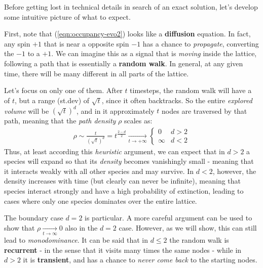 \documentclass[../../main.tex]{subfiles}
\begin{document}
Before getting lost in technical details in search of an exact solution, let's develop some intuitive picture of what to expect. 

\medskip

First, note that (\ref{eqn:occupancy-evo2}) looks like a \textbf{diffusion} equation. In fact, any spin $+1$ that is near a opposite spin $-1$ has a chance to \textit{propagate}, converting the $-1$ to a $+1$. We can imagine this as a signal that is \textit{moving} inside the lattice, following a path that is essentially a \textbf{random walk}. In general, at any given time, there will be many different  in all parts of the lattice.

\medskip

Let's focus on only one of them. After $t$ timesteps, the random walk will have a  of $t$, but a range (st.dev) of $\sqrt{t}$, since it often backtracks. So the entire \textit{explored volume} will be $(\sqrt{t})^d$, and in it approximately $t$ nodes are traversed by that path, meaning that the \textit{path density} $\rho$ scales as:
\begin{align*}
    \rho \sim \frac{t}{(\sqrt{t})^d} = t^{\frac{2-d}{2}}  \xrightarrow[t \to +\infty]{} \begin{cases}
        0 & d > 2\\
        \infty & d < 2
    \end{cases}
\end{align*} 
Thus, at least according this \textit{heuristic} argument, we can expect that in $d > 2$ a species will expand so that its \textit{density} becomes vanishingly small - meaning that it interacts weakly with all other species and may survive. In $d < 2$, however, the density increases with time (but clearly can never be infinite), meaning that species interact strongly and have a high probability of extinction, leading to cases where only one species dominates over the entire lattice.

\medskip

The boundary case $d=2$ is particular. A more careful argument can be used to show that $\rho  \xrightarrow[t \to \infty]{} 0$ also in the $d=2$ case. However, as we will show, this can still lead to \textit{monodominance}. It can be said that in $d \leq 2$ the random walk is \textbf{recurrent} - in the sense that it visits many times the same nodes - while in $d > 2$ it is \textbf{transient}, and has a chance to \textit{never come back} to the starting nodes.   
\end{document}
